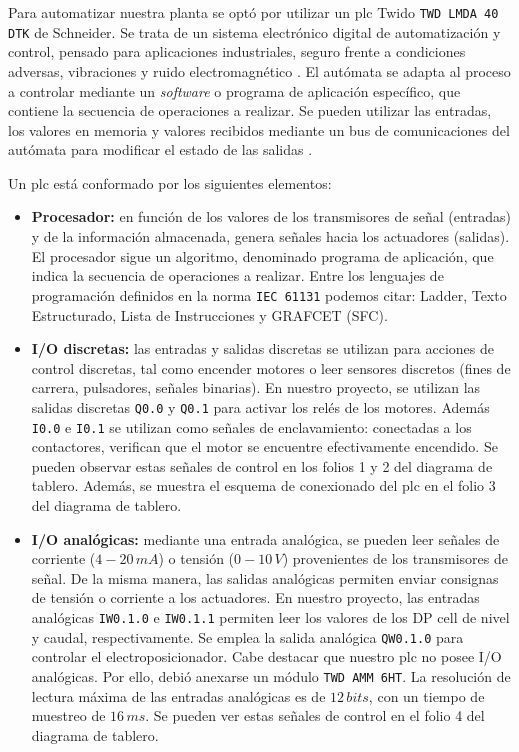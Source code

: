 Para automatizar nuestra planta se optó por utilizar un \gls{plc} Twido
\verb|TWD LMDA 40 DTK| de Schneider.
Se trata de un sistema electrónico digital de automatización y control, pensado
para aplicaciones industriales, seguro frente a condiciones adversas,
vibraciones y ruido electromagnético \cite{bib:ApuntesJGabriel}.
El autómata se adapta al proceso a controlar mediante un
\textit{software} o programa de aplicación específico, que contiene la secuencia
de operaciones a realizar.
Se pueden utilizar las entradas, los valores en memoria y valores
recibidos mediante un bus de comunicaciones del autómata para modificar el
estado de las salidas \cite{bib:libroAutomat1}.

Un \gls{plc} está conformado por los siguientes elementos:
\begin{itemize}
 \item \textbf{Procesador:} en función de los valores de los transmisores de
señal (entradas) y de la información almacenada, genera señales hacia los
actuadores
(salidas).
El procesador sigue un algoritmo, denominado programa de aplicación,
que indica la secuencia de operaciones a realizar.
Entre los lenguajes de programación definidos en la norma \verb|IEC 61131|
podemos citar: Ladder, Texto Estructurado, Lista de Instrucciones y GRAFCET
(SFC).
 \item \textbf{I/O discretas:} las entradas y salidas discretas se
utilizan para acciones de control discretas, tal como encender motores
o leer sensores discretos (fines de carrera, pulsadores, señales binarias).
En nuestro proyecto, se utilizan las salidas discretas \verb|Q0.0| y \verb|Q0.1|
para activar los relés de los motores.
Además \verb|I0.0| e \verb|I0.1| se
utilizan como señales de enclavamiento: conectadas a los contactores, verifican
que el motor se encuentre efectivamente encendido.
Se pueden observar estas señales de control en los folios 1 y 2 del diagrama de
tablero.
Además, se muestra el esquema de conexionado del \gls{plc} en el folio
3 del diagrama de tablero.
\item \textbf{I/O analógicas:} mediante una entrada
analógica, se pueden leer
señales de corriente ($4-20\,mA$) o tensión ($0-10\,V$) provenientes de los
transmisores de señal.
De la misma manera, las salidas analógicas permiten enviar consignas
de tensión o corriente a los actuadores.
En nuestro proyecto, las entradas analógicas \verb|IW0.1.0| e \verb|IW0.1.1|
permiten leer los valores de los DP cell de nivel y caudal, respectivamente.
Se emplea la salida analógica \verb|QW0.1.0| para controlar el
electroposicionador.
Cabe destacar que nuestro \gls{plc} no posee I/O analógicas.
Por ello, debió anexarse un módulo \verb|TWD AMM 6HT|.
La resolución de lectura máxima de las entradas analógicas es de $12\,bits$,
con un tiempo de muestreo de $16\,ms$.
Se pueden ver estas señales de control en el folio 4 del diagrama de tablero.


\end{itemize}
